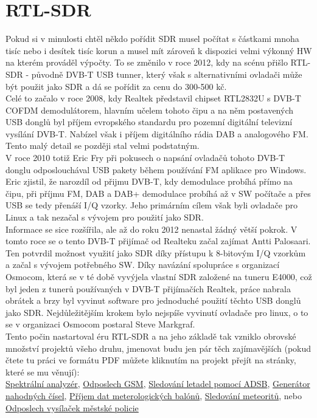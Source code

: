 \documentclass{ctuthesis}
\begin{document}
\section{RTL-SDR}
Pokud si v minulosti chtěl někdo pořídit SDR musel počítat s částkami mnoha tisíc nebo i desítek tisíc korun a musel mít zároveň k dispozici velmi výkonný HW na kterém prováděl výpočty. To se změnilo v roce 2012, kdy na scénu přišlo RTL-SDR - původně DVB-T USB tunner, který však s alternativními ovladači může být použit jako SDR a dá se pořídit za cenu do 300-500 kč.\\
Celé to začalo v roce 2008, kdy Realtek představil chipset RTL2832U s  DVB-T COFDM demodulátorem, hlavním učelem tohoto čipu a na něm postavených USB donglů byl příjem evropského standardu pro pozemní digitální televizní vysílání DVB-T. Nabízel však i příjem digitálního rádia DAB a analogového FM. Tento malý detail se později stal velmi podstatným.\\
V roce 2010 totiž Eric Fry při pokusech o napsání ovladačů tohoto DVB-T donglu odposlouchával USB pakety během používání FM aplikace pro Windows. Eric zjistil, že narozdíl od přijmu DVB-T, kdy demodulace probíhá přímo na čipu, při příjmu FM, DAB a DAB+ demodulace probíhá až v SW počítače a přes USB se tedy přenáší I/Q vzorky. Jeho primárním cílem však byli ovladače pro Linux a tak nezačal s vývojem pro použití jako SDR.\\
Informace se sice rozšířila, ale až do roku 2012 nenastal žádný větší pokrok. V tomto roce se o tento DVB-T přijímač od Realteku začal zajímat Antti Palosaari. Ten potvrdil možnost využití jako SDR díky přístupu k 8-bitovým I/Q vzorkům a začal s vývojem potřebného SW. Díky navázání spolupráce s organizací Osmocom, která se v té době vyvýjela vlastní SDR založené na tuneru E4000, což byl jeden z tunerů používaných v DVB-T přijímačích Realtek, práce nabrala obrátek a brzy byl vyvinut software pro jednoduché použití těchto USB donglů jako SDR. Nejdůležitějším krokem bylo nejspíše vyvinutí ovladače pro linux, o to se v organizaci Osmocom postaral Steve Markgraf.
\cite{rtlhistory2016}
\cite{rtlhistory2018}
\\
Tento počin nastartoval éru RTL-SDR a na jeho základě tak vzniklo obrovské množství projektů všeho druhu, jmenovat budu jen pár těch zajímavějších (pokud čtete tu práci ve formátu PDF můžete kliknutím na projekt přejít na stránky, které se mu věnují):\\ \href{https://www.rtl-sdr.com/rtl-sdr-used-as-a-spectrum-analyzer/}{Spektrální analyzér}, \href{https://www.rtl-sdr.com/rtl-sdr-tutorial-analyzing-gsm-with-airprobe-and-wireshark/}{Odposlech GSM}, \href{https://www.rtl-sdr.com/adsb-aircraft-radar-with-rtl-sdr/}{Sledování letadel pomocí ADSB}, \href{https://www.rtl-sdr.com/using-rtl-sdr-cheap-entropy-source/}{Generátor nahodných čísel}, \href{https://www.rtl-sdr.com/receiving-weather-balloon-data-with-rtl-sdr/}{Příjem dat meterologických balónů}, \href{https://www.rtl-sdr.com/meteor-reflection-observations-with-rtl-sdr/}{Sledování meteoritů}, nebo \href{https://technet.idnes.cz/odposlech-site-tetra-a-mestske-policie-dhy-/tec_technika.aspx?c=A160913_145939_tec_technika_vse}{Odposlech vysílaček městské policie}\\
\end{document}
